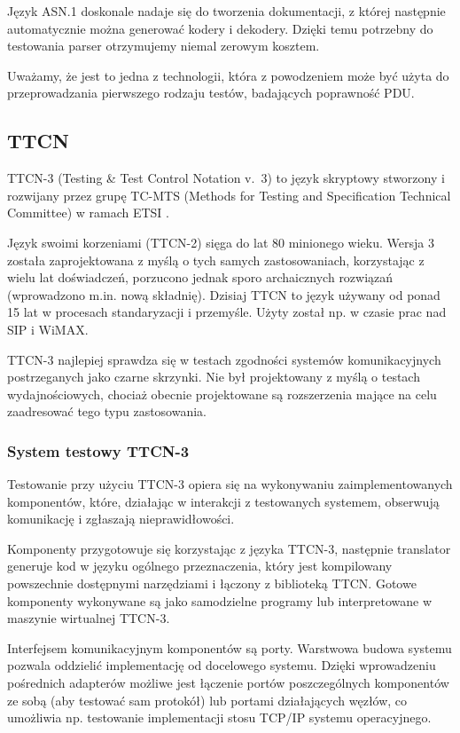 \documentclass[00-praca-magisterska.tex]{subfiles}
\begin{document}
Język ASN.1 doskonale nadaje się do tworzenia dokumentacji, z której następnie
automatycznie można generować kodery i dekodery. Dzięki temu potrzebny do
testowania parser otrzymujemy niemal zerowym kosztem.

Uważamy, że jest to jedna z technologii, która z powodzeniem może być użyta do
przeprowadzania pierwszego rodzaju testów, badających poprawność PDU.

\subsection{TTCN}
\label{ttcn}

TTCN-3 (Testing \& Test Control Notation v.~3) to język skryptowy stworzony i
rozwijany przez grupę TC-MTS (Methods for Testing and Specification Technical
Committee) w ramach ETSI \cite{ttcn-main}.

Język swoimi korzeniami (TTCN-2) sięga do lat 80 minionego wieku. Wersja 3
została zaprojektowana z myślą o tych samych zastosowaniach, korzystając z wielu
lat doświadczeń, porzucono jednak sporo archaicznych rozwiązań (wprowadzono
m.in. nową składnię). Dzisiaj TTCN to język używany od ponad 15 lat w procesach
standaryzacji i przemyśle. Użyty został np. w czasie prac nad SIP i WiMAX.

TTCN-3 najlepiej sprawdza się w testach zgodności systemów komunikacyjnych
postrzeganych jako czarne skrzynki. Nie był projektowany z myślą o testach
wydajnościowych, chociaż obecnie projektowane są rozszerzenia mające na celu
zaadresować tego typu zastosowania.

\subsubsection{System testowy TTCN-3}

Testowanie przy użyciu TTCN-3 opiera się na wykonywaniu zaimplementowanych
komponentów, które, działając w interakcji z testowanych systemem, obserwują
komunikację i zgłaszają nieprawidłowości.

Komponenty przygotowuje się korzystając z języka TTCN-3, następnie translator
generuje kod w języku ogólnego przeznaczenia, który jest kompilowany powszechnie
dostępnymi narzędziami i łączony z biblioteką TTCN. Gotowe komponenty wykonywane
są jako samodzielne programy lub interpretowane w maszynie wirtualnej TTCN-3.

Interfejsem komunikacyjnym komponentów są porty. Warstwowa budowa systemu
pozwala oddzielić implementację od docelowego systemu. Dzięki wprowadzeniu
pośrednich adapterów możliwe jest łączenie portów poszczególnych komponentów ze
sobą (aby testować sam protokół) lub portami działających węzłów, co umożliwia
np. testowanie implementacji stosu TCP/IP systemu operacyjnego.
\end{document}
